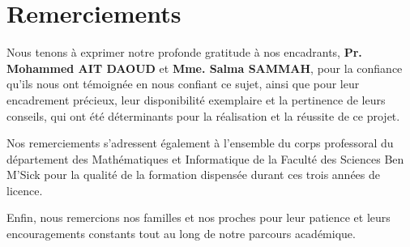 \newpage
\thispagestyle{empty}
\section*{Remerciements}

Nous tenons à exprimer notre profonde gratitude à nos encadrants, \textbf{Pr. Mohammed AIT DAOUD} et \textbf{Mme. Salma SAMMAH}, pour la confiance qu'ils nous ont témoignée en nous confiant ce sujet, ainsi que pour leur encadrement précieux, leur disponibilité exemplaire et la pertinence de leurs conseils, qui ont été déterminants pour la réalisation et la réussite de ce projet.

Nos remerciements s'adressent également à l'ensemble du corps professoral du département des Mathématiques et Informatique de la Faculté des Sciences Ben M'Sick pour la qualité de la formation dispensée durant ces trois années de licence.

Enfin, nous remercions nos familles et nos proches pour leur patience et leurs encouragements constants tout au long de notre parcours académique.
